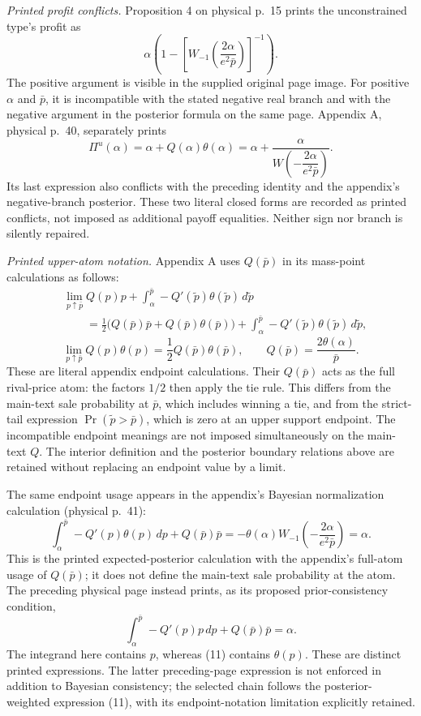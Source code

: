 \documentclass{article}
\begin{document}
\emph{Printed profit conflicts.} Proposition 4 on physical p.~15 prints the unconstrained type's profit as
\[
\alpha\left(
1-\left[
W_{-1}\!\left(\frac{2\alpha}{e^{2}\bar p}\right)
\right]^{-1}
\right).
\]
The positive argument is visible in the supplied original page image. For positive $\alpha$ and $\bar p$, it is incompatible with the stated negative real branch and with the negative argument in the posterior formula on the same page. Appendix A, physical p.~40, separately prints
\[
\Pi^{u}(\alpha)
 =\alpha+Q(\alpha)\theta(\alpha)
 =\alpha+\frac{\alpha}{W\!\left(-\dfrac{2\alpha}{e^{2}\bar p}\right)}.
\]
Its last expression also conflicts with the preceding identity and the appendix's negative-branch posterior. These two literal closed forms are recorded as printed conflicts, not imposed as additional payoff equalities. Neither sign nor branch is silently repaired.

\emph{Printed upper-atom notation.} Appendix A uses $Q(\bar p)$ in its mass-point calculations as follows:
\[
\begin{aligned}
&\lim_{p\uparrow\bar p}Q(p)p
 +\int_{\alpha}^{\bar p}-Q'(\tilde p)\theta(\tilde p)\,d\tilde p\\
&\qquad=
 \frac12\bigl(Q(\bar p)\bar p+Q(\bar p)\theta(\bar p)\bigr)
 +\int_{\alpha}^{\bar p}-Q'(\tilde p)\theta(\tilde p)\,d\tilde p,
\end{aligned}
\]
\[
\lim_{p\uparrow\bar p}Q(p)\theta(p)
 =\frac12Q(\bar p)\theta(\bar p),
\qquad
Q(\bar p)=\frac{2\theta(\alpha)}{\bar p}.
\]
These are literal appendix endpoint calculations. Their $Q(\bar p)$ acts as the full rival-price atom: the factors $1/2$ then apply the tie rule. This differs from the main-text sale probability at $\bar p$, which includes winning a tie, and from the strict-tail expression $\Pr(\tilde p>\bar p)$, which is zero at an upper support endpoint. The incompatible endpoint meanings are not imposed simultaneously on the main-text $Q$. The interior definition and the posterior boundary relations above are retained without replacing an endpoint value by a limit.

The same endpoint usage appears in the appendix's Bayesian normalization calculation (physical p.~41):
\begin{equation}
\int_{\alpha}^{\bar p}-Q'(p)\theta(p)\,dp
 +Q(\bar p)\bar p
 =-\theta(\alpha)
 W_{-1}\!\left(-\frac{2\alpha}{e^{2}\bar p}\right)
 =\alpha.
\tag{11}
\end{equation}
This is the printed expected-posterior calculation with the appendix's full-atom usage of $Q(\bar p)$; it does not define the main-text sale probability at the atom. The preceding physical page instead prints, as its proposed prior-consistency condition,
\[
\int_{\alpha}^{\bar p}-Q'(p)p\,dp
 +Q(\bar p)\bar p=\alpha.
\]
The integrand here contains $p$, whereas (11) contains $\theta(p)$. These are distinct printed expressions. The latter preceding-page expression is not enforced in addition to Bayesian consistency; the selected chain follows the posterior-weighted expression (11), with its endpoint-notation limitation explicitly retained.
\end{document}
